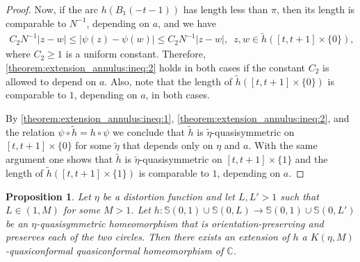 \documentclass[letterpaper]{amsart}
\theoremstyle{plain}
\newtheorem{proposition}[theorem]{Proposition}
\theoremstyle{definition}
\theoremstyle{remark}
\numberwithin{equation}{section}
\numberwithin{theorem}{section}
\newcommand{\C}{\mathbb C}
\begin{document}
\begin{proof}
Now, if the arc $h(B_1(-t-1))$ has length less than $\pi$, then its length is comparable to $N^{-1}$, depending on $a$, and we have
\begin{align}\label{theorem:extension_annulus:ineq:2}
 C_2 N^{-1} |z-w|\leq |\psi(z)-\psi(w)|\leq C_2 N^{-1}|z-w|,\,\,\, z,w\in \widetilde h([t,t+1]\times \{0\}),
\end{align}
where $C_2\geq 1$ is a uniform constant. Therefore, \eqref{theorem:extension_annulus:ineq:2} holds in both cases if the constant $C_2$ is allowed to depend on $a$. Also, note that the length of $\widetilde h([t,t+1]\times \{0\})$ is comparable to $1$, depending on $a$, in both cases.  

By \eqref{theorem:extension_annulus:ineq:1},  \eqref{theorem:extension_annulus:ineq:2}, and the relation $\psi\circ \widetilde h=h\circ \psi$ we conclude that $\widetilde h$ is $\widetilde \eta$-quasi\-symmetric on $[t,t+1]\times \{0\}$ for some $\widetilde \eta$ that depends only on $\eta$ and $a$.  With the same argument one shows that $\widetilde h$ is $\widetilde \eta$-quasisymmetric on $[t,t+1]\times \{1\}$ and the length of $\widetilde h ([t,t+1]\times \{1\})$ is comparable to $1$, depending on $a$.
\end{proof}

\begin{proposition}\label{corollary:extension_annulus}
Let $\eta$ be a distortion function and let $L,L'>1$ such that $L\in (1,M)$ for some $M>1$. Let $h\colon  \mathbb S(0,1)\cup \mathbb S(0,L) \to \mathbb S(0,1)\cup \mathbb S(0,L') $ be an $\eta$-quasisymmetric homeomorphism that is orien\-tation-preserving and preserves each of the two circles. Then there exists an extension of $h$ a $K(\eta,M)$-quasi\-conformal quasiconformal homeomorphism of $\C$.
\end{proposition}
\end{document}
